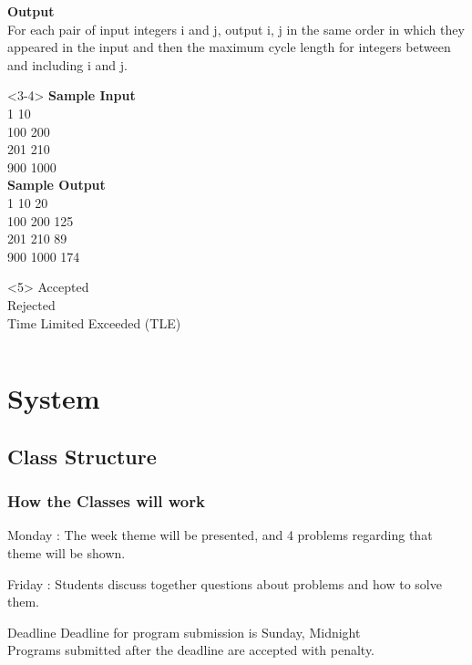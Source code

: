 \documentclass{beamer}
\begin{document}
\begin{frame}
\begin{columns}[c]
\begin{block}{}
\begin{onlyenv}
{        {\bf Output}\\
        For each pair of input integers i and j, output i, j in the
        same order in which they appeared in the input and then the
        maximum cycle length for integers between and including i and
        j.}
      \end{onlyenv}
      \begin{onlyenv}<3-4>
        {\small
        {\bf Sample Input}\\
        1 10\\
        100 200\\
        201 210\\
        900 1000\\
        
        {\bf Sample Output}\\
        1 10 20\\
        100 200 125\\
        201 210 89\\
        900 1000 174\\}
      \end{onlyenv}
      \begin{onlyenv}<5>
        Accepted\\
        Rejected\\
        Time Limited Exceeded (TLE)\\
      \end{onlyenv}
    \end{block}
  \end{columns}
\end{frame}

\section{System}
\subsection{Class Structure}
\begin{frame}
  \frametitle{How the Classes will work}
  \begin{block}{Monday}
    : The week theme will be
    presented, and 4 problems regarding that theme will be shown.
  \end{block}
  \begin{block}{Friday}
    : Students discuss together
    questions about problems and how to solve them.
  \end{block}
  \begin{block}{Deadline}
    Deadline for program submission is \alert{Sunday, Midnight}\\
    Programs submitted after the deadline are accepted with penalty.
  \end{block}
\end{frame}
\end{document}
